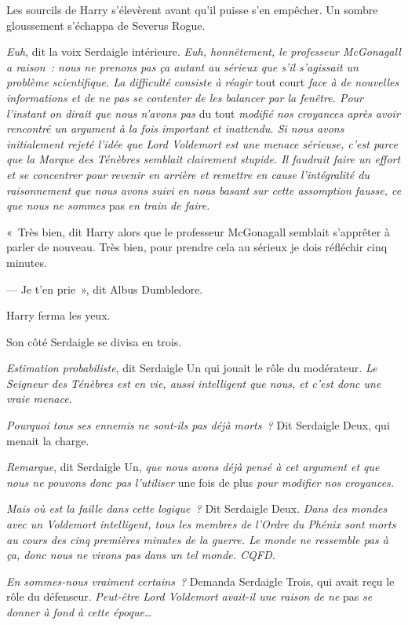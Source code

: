 Les sourcils de Harry s'élevèrent avant qu'il puisse s'en empêcher. Un sombre gloussement s'échappa de Severus Rogue.

\emph{Euh}, dit la voix Serdaigle intérieure. \emph{Euh, honnêtement, le professeur McGonagall a raison~: nous ne prenons pas ça autant au sérieux que s'il s'agissait un problème scientifique. La difficulté consiste à réagir} tout court \emph{face à de nouvelles informations et de ne pas se contenter de les balancer par la fenêtre. Pour l'instant on dirait que nous n'avons pas} du tout \emph{modifié nos croyances après avoir rencontré un argument à la fois important et inattendu. Si nous avons initialement rejeté l'idée que Lord Voldemort est une menace sérieuse, c'est parce que la Marque des Ténèbres semblait clairement stupide. Il faudrait faire un effort et se concentrer pour revenir en arrière et remettre en cause l'intégralité du raisonnement que nous avons suivi en nous basant sur cette assomption fausse, ce que nous ne sommes} pas \emph{en train de faire.}

«~Très bien, dit Harry alors que le professeur McGonagall semblait s'apprêter à parler de nouveau. Très bien, pour prendre cela au sérieux je dois réfléchir cinq minutes.

--- Je t'en prie~», dit Albus Dumbledore.

Harry ferma les yeux.

Son côté Serdaigle se divisa en trois.

\emph{Estimation probabiliste}, dit Serdaigle Un qui jouait le rôle du modérateur. \emph{Le Seigneur des Ténèbres est en vie, aussi intelligent que nous, et c'est donc une vraie menace.}

\emph{Pourquoi tous ses ennemis ne sont-ils pas déjà morts~?} Dit Serdaigle Deux, qui menait la charge.

\emph{Remarque}, dit Serdaigle Un, \emph{que nous avons déjà pensé à cet argument et que nous ne pouvons donc pas l'utiliser} une fois de plus \emph{pour modifier nos croyances.}

\emph{Mais où est la faille dans cette logique~?} Dit Serdaigle Deux. \emph{Dans des mondes avec un Voldemort intelligent, tous les membres de l'Ordre du Phénix sont morts au cours des cinq premières minutes de la guerre. Le monde ne ressemble pas à ça, donc nous ne vivons pas dans un tel monde. CQFD.}

\emph{En sommes-nous vraiment certains~?} Demanda Serdaigle Trois, qui avait reçu le rôle du défenseur. \emph{Peut-être Lord Voldemort avait-il une raison de ne} pas \emph{se donner à fond à cette époque…}

